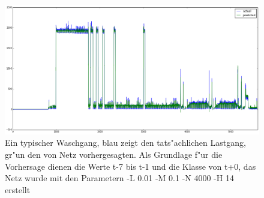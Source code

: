 \begin{figure}[ht]
\includegraphics[height=0.7\textwidth , angle=90]{1_Grafiken/predicted.png}
	\caption[Typischer Waschgang, vorhergesagt]{Ein typischer Waschgang, blau zeigt den tats"achlichen Lastgang, gr"un den von Netz vorhergesagten. Als Grundlage f"ur die Vorhersage dienen die Werte t-7 bis t-1 und die Klasse von t+0, das Netz wurde mit den Parametern -L 0.01 -M 0.1 -N 4000 -H 14 erstellt}
\label{GenWasch}
\end{figure}